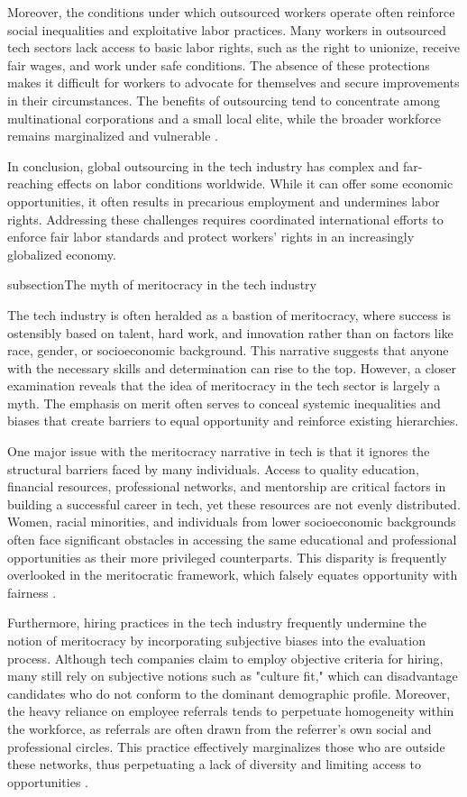 Moreover, the conditions under which outsourced workers operate often reinforce social inequalities and exploitative labor practices. Many workers in outsourced tech sectors lack access to basic labor rights, such as the right to unionize, receive fair wages, and work under safe conditions. The absence of these protections makes it difficult for workers to advocate for themselves and secure improvements in their circumstances. The benefits of outsourcing tend to concentrate among multinational corporations and a small local elite, while the broader workforce remains marginalized and vulnerable \cite[pp.~11-14]{sassen2014expulsions}.

In conclusion, global outsourcing in the tech industry has complex and far-reaching effects on labor conditions worldwide. While it can offer some economic opportunities, it often results in precarious employment and undermines labor rights. Addressing these challenges requires coordinated international efforts to enforce fair labor standards and protect workers' rights in an increasingly globalized economy.

subsection{The myth of meritocracy in the tech industry}

The tech industry is often heralded as a bastion of meritocracy, where success is ostensibly based on talent, hard work, and innovation rather than on factors like race, gender, or socioeconomic background. This narrative suggests that anyone with the necessary skills and determination can rise to the top. However, a closer examination reveals that the idea of meritocracy in the tech sector is largely a myth. The emphasis on merit often serves to conceal systemic inequalities and biases that create barriers to equal opportunity and reinforce existing hierarchies.

One major issue with the meritocracy narrative in tech is that it ignores the structural barriers faced by many individuals. Access to quality education, financial resources, professional networks, and mentorship are critical factors in building a successful career in tech, yet these resources are not evenly distributed. Women, racial minorities, and individuals from lower socioeconomic backgrounds often face significant obstacles in accessing the same educational and professional opportunities as their more privileged counterparts. This disparity is frequently overlooked in the meritocratic framework, which falsely equates opportunity with fairness \cite[pp.~543-548]{castilla2008gender}.

Furthermore, hiring practices in the tech industry frequently undermine the notion of meritocracy by incorporating subjective biases into the evaluation process. Although tech companies claim to employ objective criteria for hiring, many still rely on subjective notions such as "culture fit," which can disadvantage candidates who do not conform to the dominant demographic profile. Moreover, the heavy reliance on employee referrals tends to perpetuate homogeneity within the workforce, as referrals are often drawn from the referrer's own social and professional circles. This practice effectively marginalizes those who are outside these networks, thus perpetuating a lack of diversity and limiting access to opportunities \cite[pp.~999-1002]{rivera2012hiring}.

